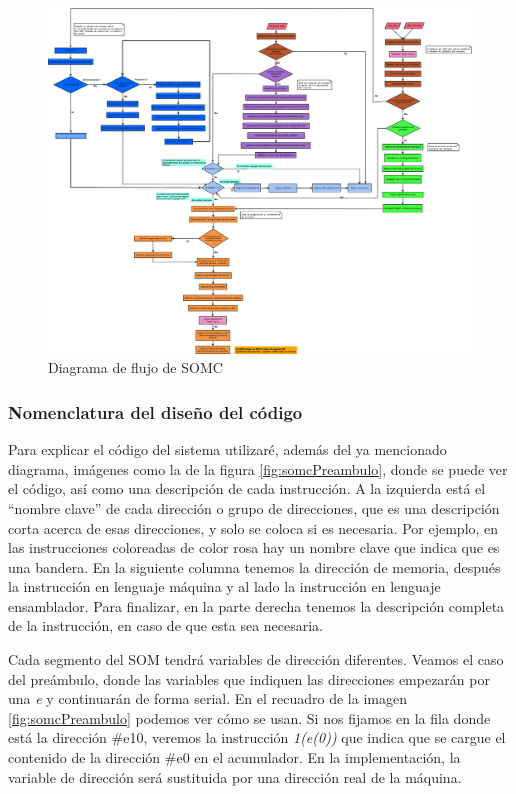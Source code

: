 \documentclass[letterpaper,12pt,oneside]{book}
\begin{document}
		\begin{figure}[p]		
			\centering
			\includegraphics[width=\textwidth,height=\textheight,keepaspectratio]{media/CARDIACC/Diagrama_Flujo_SO.eps}
			\caption{Diagrama de flujo de SOMC}
			\label{fig:diagramaSOMC}
		\end{figure}		
		

		
		\subsubsection{Nomenclatura del diseño del código}
		
		Para explicar el código del sistema utilizaré, además del ya mencionado diagrama, imágenes como la de la figura \ref{fig:somcPreambulo}, donde
		se puede ver el código, así como una descripción de cada instrucción. A la izquierda está el ``nombre clave'' de cada dirección o grupo
		de direcciones, que es una descripción corta acerca de esas direcciones, y solo se coloca si es necesaria. Por ejemplo, en las instrucciones
		coloreadas de color rosa hay un nombre clave que indica que es una bandera. En la siguiente columna tenemos la dirección de memoria, después
		la instrucción en lenguaje máquina y al lado la instrucción en lenguaje ensamblador. Para finalizar, en la parte derecha tenemos la descripción 
		completa de la instrucción, en caso de que esta sea necesaria.
  
        Cada segmento del SOM tendrá variables de dirección diferentes. Veamos el caso del
		preámbulo, donde las variables que indiquen las direcciones empezarán por una \textit{e} y continuarán de forma serial. En el recuadro
		de la imagen \ref{fig:somcPreambulo} podemos ver cómo se usan. Si nos fijamos en la fila donde está la dirección \#e10, veremos la instrucción
		\textit{1(e(0))} que indica que se cargue el contenido de la dirección \#e0 en el acumulador. En la implementación, la variable
		de dirección será sustituida por una dirección real de la máquina.
		
\end{document}

